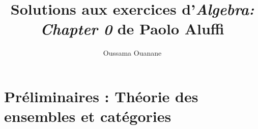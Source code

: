 \documentclass[a4paper]{report}
\title{Solutions aux exercices d'\textit{Algebra: Chapter 0} de Paolo Aluffi}
\author{Oussama Ouanane}
\begin{document}
\maketitle

\tableofcontents

\chapter{Préliminaires : Théorie des ensembles et catégories}

\end{document}
